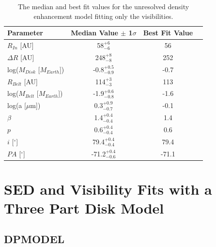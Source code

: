 {{\begin{table}
\begin{center}
    \def\arraystretch{1.37}%
    \begin{tabular}{l*{2}{c}r}
    \hline
    Parameter & Median Value $\pm$ 1$\sigma$ & Best Fit Value \\ \hline
     $R_{In}$  [AU] & 58$^{+6}_{-6}$ & 56\\  
     $\Delta R$ [AU] & 248$^{+8}_{-8}$ & 252\\ 
     log($M_{Disk}$ [$M_{Earth}$]) & -0.8$^{+0.5}_{-0.9}$ & -0.7 \\
     $R_{Belt}$  [AU] & 114$^{+3}_{-3}$ & 113\\ 
     log($M_{Belt}$ [$M_{Earth}$]) & -1.9$^{+0.6}_{-0.8}$ & -1.6\\
     log(a [$\mu$m]) & 0.3$^{+0.9}_{-0.7}$ & -0.1\\ 
     $\beta$ & 1.4$^{+0.4}_{-0.4}$ & 1.4\\ 
     $p$ & 0.6$^{+0.4}_{-0.4}$ & 0.6\\ 
     $i$ [$^\circ$] & 79.4$^{+0.4}_{-0.4}$ & 79.4 \\ 
     $PA$ [$^\circ$] & -71.2$^{+0.4}_{-0.6}$ & -71.1\\
    \hline
    \end{tabular}
\end{center}
\caption{The median and best fit values for the unresolved density enhancement model fitting only the visibilities.}
\label{tab:49CET_BonusBeltVIS_Table}
\end{table}



\section{SED and Visibility Fits with a Three Part Disk Model}
\label{ThreePart}

\subsection{DPMODEL}
\label{dunno}

}}
